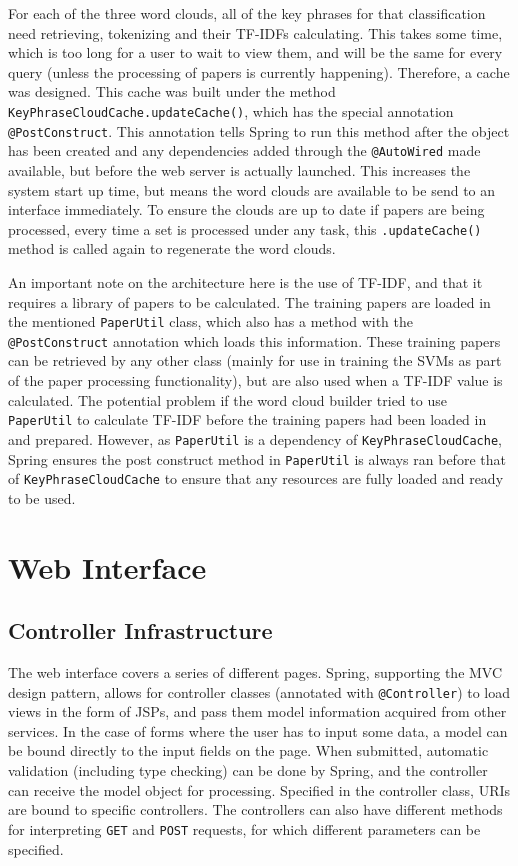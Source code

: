 For each of the three word clouds, all of the key phrases for that classification need retrieving, tokenizing and their TF-IDFs calculating. This takes some time, which is too long for a user to wait to view them, and will be the same for every query (unless the processing of papers is currently happening). Therefore, a cache was designed. This cache was built under the method \texttt{KeyPhraseCloudCache.updateCache()}, which has the special annotation \texttt{@PostConstruct}. This annotation tells Spring to run this method after the object has been created and any dependencies added through the \texttt{@AutoWired} made available, but before the web server is actually launched. This increases the system start up time, but means the word clouds are available to be send to an interface immediately. To ensure the clouds are up to date if papers are being processed, every time a set is processed under any task, this \texttt{.updateCache()} method is called again to regenerate the word clouds.

An important note on the architecture here is the use of TF-IDF, and that it requires a library of papers to be calculated. The training papers are loaded in the mentioned \texttt{PaperUtil} class, which also has a method with the \texttt{@PostConstruct} annotation which loads this information. These training papers can be retrieved by any other class (mainly for use in training the SVMs as part of the paper processing functionality), but are also used when a TF-IDF value is calculated. The potential problem if the word cloud builder tried to use \texttt{PaperUtil} to calculate TF-IDF before the training papers had been loaded in and prepared. However, as \texttt{PaperUtil} is a dependency of \texttt{KeyPhraseCloudCache}, Spring ensures the post construct method in \texttt{PaperUtil} is always ran before that of \texttt{KeyPhraseCloudCache} to ensure that any resources are fully loaded and ready to be used. 

\section{Web Interface}
\subsection*{Controller Infrastructure}
The web interface covers a series of different pages. Spring, supporting the MVC design pattern, allows for controller classes (annotated with \texttt{@Controller}) to load views in the form of JSPs, and pass them model information acquired from other services. In the case of forms where the user has to input some data, a model can be bound directly to the input fields on the page. When submitted, automatic validation (including type checking) can be done by Spring, and the controller can receive the model object for processing. Specified in the controller class, URIs are bound to specific controllers. The controllers can also have different methods for interpreting \texttt{GET} and \texttt{POST} requests, for which different parameters can be specified.

